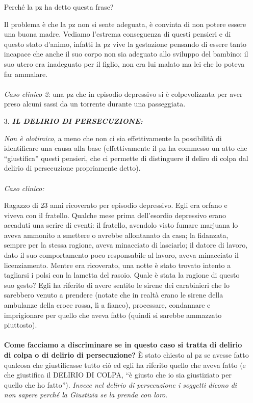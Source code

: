 \begin{itemize}
Perché la pz ha detto questa frase?

Il problema è che la pz non si sente adeguata, è convinta di non potere
essere una buona madre. Vediamo l'estrema conseguenza di questi pensieri
e di questo stato d'animo, infatti la pz vive la gestazione pensando di
essere tanto incapace che anche il suo corpo non sia adeguato allo
sviluppo del bambino: il suo utero era inadeguato per il figlio, non era
lui malato ma lei che lo poteva far ammalare.
\\\\
\emph{Caso clinico 2}: una pz che in episodio depressivo si è
colpevolizzata per aver preso alcuni sassi da un torrente durante una
passeggiata.

\item[3.]
  \textbf{\emph{IL DELIRIO DI PERSECUZIONE:}}

\emph{Non è olotimico}, a meno che non ci sia effettivamente la
possibilità di identificare una causa alla base (effettivamente il pz ha
commesso un atto che ``giustifica'' questi pensieri, che ci permette di
distinguere il deliro di colpa dal delirio di persecuzione propriamente
detto).
\\\\
\emph{Caso clinico:}

Ragazzo di 23 anni ricoverato per episodio depressivo. Egli era orfano e
viveva con il fratello. Qualche mese prima dell'esordio depressivo erano
accaduti una serire di eventi: il fratello, avendolo visto fumare
marjuana lo aveva ammonito a smettere o avrebbe allontanato da casa; la
fidanzata, sempre per la stessa ragione, aveva minacciato di lasciarlo;
il datore di lavoro, dato il suo comportamento poco responsabile al
lavoro, aveva minacciato il licenziamento. Mentre era ricoverato, una
notte è stato trovato intento a tagliarsi i polsi con la lametta del
rasoio. Quale è stata la ragione di questo suo gesto? Egli ha riferito
di avere sentito le sirene dei carabinieri che lo sarebbero venuto a
prendere (notate che in realtà erano le sirene della ambulanze della
croce rossa, lì a fianco), processare, condannare e imprigionare per
quello che aveva fatto (quindi si sarebbe ammazzato piuttosto).
\\\\
\textbf{Come facciamo a discriminare se in questo caso si tratta di
delirio di colpa o di delirio di persecuzione?} È stato chiesto al pz se
avesse fatto qualcosa che giustificasse tutto ciò ed egli ha riferito
quello che aveva fatto (e che giustifica il DELIRIO DI COLPA, ``è giusto
che io sia giustiziato per quello che ho fatto''). \emph{Invece nel
delirio di persecuzione i soggetti dicono di non sapere perché la
Giustizia se la prenda con loro}.


\end{itemize}
